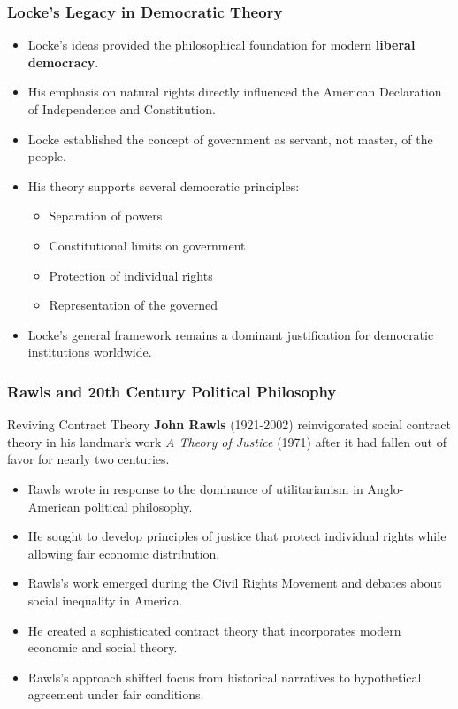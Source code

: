 \documentclass[aspectratio=169]{beamer}
\begin{document}
\begin{frame}
  \frametitle{Locke's Legacy in Democratic Theory}
  
  \begin{itemize}
    \item Locke's ideas provided the philosophical foundation for modern \textbf{liberal democracy}.
    \item His emphasis on natural rights directly influenced the American Declaration of Independence and Constitution.
    \item Locke established the concept of government as servant, not master, of the people.
    \item His theory supports several democratic principles:
      \begin{itemize}
        \item Separation of powers
        \item Constitutional limits on government
        \item Protection of individual rights
        \item Representation of the governed
      \end{itemize}
    \item Locke's general framework remains a dominant justification for democratic institutions worldwide.
  \end{itemize}
\end{frame}

\begin{frame}
  \frametitle{Rawls and 20th Century Political Philosophy}
  
  \begin{block}{Reviving Contract Theory}
    \textbf{John Rawls} (1921-2002) reinvigorated social contract theory in his landmark work \textit{A Theory of Justice} (1971) after it had fallen out of favor for nearly two centuries.
  \end{block}
  
  \begin{itemize}
    \item Rawls wrote in response to the dominance of utilitarianism in Anglo-American political philosophy.
    \item He sought to develop principles of justice that protect individual rights while allowing fair economic distribution.
    \item Rawls's work emerged during the Civil Rights Movement and debates about social inequality in America.
    \item He created a sophisticated contract theory that incorporates modern economic and social theory.
    \item Rawls's approach shifted focus from historical narratives to hypothetical agreement under fair conditions.
  \end{itemize}
\end{frame}
\end{document}
